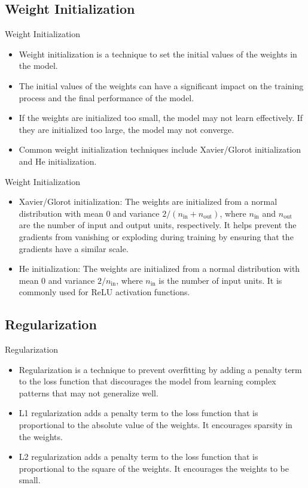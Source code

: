 \subsection{Weight Initialization}
\begin{frame}{}{Weight Initialization}
    \begin{itemize}
        \item Weight initialization is a technique to set the initial values of the weights in the model.
        \item The initial values of the weights can have a significant impact on the training process and the final performance of the model.
        \item If the weights are initialized too small, the model may not learn effectively. If they are initialized too large, the model may not converge.
        \item Common weight initialization techniques include Xavier/Glorot initialization and He initialization.
    \end{itemize}
\end{frame}
\begin{frame}{}{Weight Initialization}
    \begin{itemize}
        \item Xavier/Glorot initialization: The weights are initialized from a normal distribution with mean 0 and variance $2/(n_{\text{in}} + n_{\text{out}})$, where $n_{\text{in}}$ and $n_{\text{out}}$ are the number of input and output units, respectively. It helps prevent the gradients from vanishing or exploding during training by ensuring that the gradients have a similar scale.
        \item He initialization: The weights are initialized from a normal distribution with mean 0 and variance $2/n_{\text{in}}$, where $n_{\text{in}}$ is the number of input units. It is commonly used for ReLU activation functions.
    \end{itemize}
\end{frame}

\subsection{Regularization}
\begin{frame}{}{Regularization}
    \begin{itemize}
        \item Regularization is a technique to prevent overfitting by adding a penalty term to the loss function that discourages the model from learning complex patterns that may not generalize well.
        \item L1 regularization adds a penalty term to the loss function that is proportional to the absolute value of the weights. It encourages sparsity in the weights.
        \item L2 regularization adds a penalty term to the loss function that is proportional to the square of the weights. It encourages the weights to be small.
    \end{itemize}
\end{frame}

